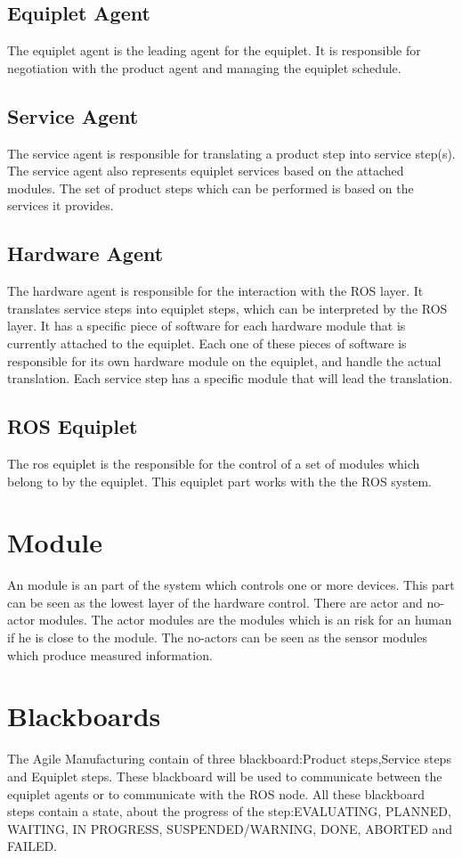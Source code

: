 \documentclass[12pt,a4paper]{report}
\begin{document}
\subsection{Equiplet Agent}
The equiplet agent is the leading agent for the equiplet. It is responsible for negotiation with the product agent and managing the equiplet schedule.\cite{REXOS_Design}

\subsection{Service Agent}
The service agent is responsible for translating a product step into service step(s). The service agent also represents equiplet services based on the attached modules. The set of product steps which can be performed is based on the services it provides.\cite{REXOS_Design}

\subsection{Hardware Agent}
The hardware agent is responsible for the interaction with the ROS layer. It translates service steps into equiplet steps, which can be interpreted by the ROS layer. It has a specific piece of software for each hardware module that is currently attached to the equiplet. Each one of these pieces of software is responsible for its own hardware module on the equiplet, and handle the actual translation. Each service step has a specific module that will lead the translation. \cite{REXOS_Design}

\subsection{ROS Equiplet}
The ros equiplet is the responsible for the control of a set of modules which belong to by the equiplet. This equiplet part works with the the ROS system.

\section{Module}
An module is an part of the system which controls one or more devices. This part can be seen as the lowest layer of the hardware control.
There are actor and no-actor modules. The actor modules are the modules which is an risk for an human if he is close to the module. The no-actors can be seen as the sensor modules which produce measured information.  

\section{Blackboards}
The Agile Manufacturing contain of three blackboard:Product steps,Service steps and Equiplet steps. These blackboard will be used to communicate between the equiplet agents or to communicate with the ROS node. All these blackboard steps contain a state, about the progress of the step:EVALUATING, PLANNED, WAITING, IN PROGRESS, SUSPENDED/WARNING, DONE, ABORTED and FAILED.
\end{document}
